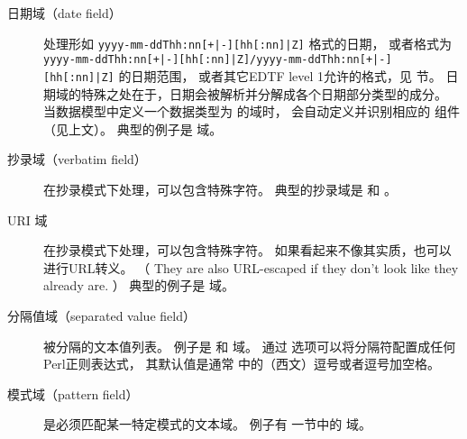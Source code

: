 \begin{description}
\begin{description}
\item[日期域（date field）] 处理形如 \texttt{yyyy-mm-ddThh:nn[+|-][hh[:nn]|Z]} 格式的日期，
或者格式为 \texttt{yyyy-mm-ddThh:nn[+|-][hh[:nn]|Z]/yyyy-mm-ddThh:nn[+|-][hh[:nn]|Z]} 的日期范围，
或者其它EDTF level 1允许的格式，见  节。
日期域的特殊之处在于，日期会被解析并分解成各个日期部分类型的成分。
当数据模型中定义一个数据类型为  的域时，
会自动定义并识别相应的  组件（见上文）。
典型的例子是  域。


\item[抄录域（verbatim field）] 在抄录模式下处理，可以包含特殊字符。
典型的抄录域是  和 。

\item[URI 域] 在抄录模式下处理，可以包含特殊字符。
如果看起来不像其实质，也可以进行URL转义。
（ They are also URL-escaped if they don't look like they already are. ）
典型的例子是  域。


\item[分隔值域（separated value field）]
被分隔的文本值列表。
例子是  和  域。
通过  选项可以将分隔符配置成任何Perl正则表达式，
其默认值是通常 \BibTeX 中的（西文）逗号或者逗号加空格。


\item[模式域（pattern field）] 是必须匹配某一特定模式的文本域。
例子有  一节中的  域。


\end{description}
\end{description}
